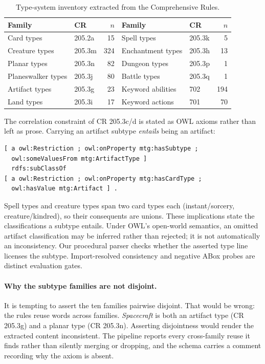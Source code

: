\documentclass[11pt,a4paper]{article}
\begin{document}
\begin{table}[h]
\centering
\small
\begin{tabular}{llr@{\hskip 2em}llr}
\toprule
\textbf{Family} & \textbf{CR} & \textbf{$n$} & \textbf{Family} & \textbf{CR} & \textbf{$n$} \\
\midrule
Card types        & 205.2a & 15  & Spell types       & 205.3k & 5 \\
Creature types    & 205.3m & 324 & Enchantment types & 205.3h & 13 \\
Planar types      & 205.3n & 82  & Dungeon types     & 205.3p & 1 \\
Planeswalker types& 205.3j & 80  & Battle types      & 205.3q & 1 \\
Artifact types    & 205.3g & 23  & Keyword abilities & 702    & 194 \\
Land types        & 205.3i & 17  & Keyword actions   & 701    & 70 \\
\bottomrule
\end{tabular}
\caption{Type-system inventory extracted from the Comprehensive Rules.}
\label{tab:types}
\end{table}

The correlation constraint of CR 205.3c/d is stated as OWL axioms rather than left as prose. Carrying an artifact subtype \emph{entails} being an artifact:

\begin{lstlisting}[language=Turtle, caption={CR 205.3d as a subclass axiom between restrictions.}]
[ a owl:Restriction ; owl:onProperty mtg:hasSubtype ;
  owl:someValuesFrom mtg:ArtifactType ]
  rdfs:subClassOf
[ a owl:Restriction ; owl:onProperty mtg:hasCardType ;
  owl:hasValue mtg:Artifact ] .
\end{lstlisting}

Spell types and creature types span two card types each (instant/sorcery, creature/kindred), so their consequents are unions. These implications state the classifications a subtype entails. Under OWL's open-world semantics, an omitted artifact classification may be inferred rather than rejected; it is not automatically an inconsistency. Our procedural parser checks whether the asserted type line licenses the subtype. Import-resolved consistency and negative ABox probes are distinct evaluation gates.

\paragraph{Why the subtype families are not disjoint.} It is tempting to assert the ten families pairwise disjoint. That would be wrong: the rules reuse words across families. \emph{Spacecraft} is both an artifact type (CR 205.3g) and a planar type (CR 205.3n). Asserting disjointness would render the extracted content inconsistent. The pipeline reports every cross-family reuse it finds rather than silently merging or dropping, and the schema carries a comment recording why the axiom is absent.
\end{document}

